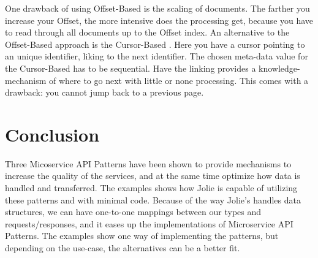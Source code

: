 \documentclass[12pt]{article}
\begin{document}
One drawback of using Offset-Based is the scaling of documents. The farther you increase your Offset, the more intensive does the processing get, because you have to read through all documents up to the Offset index. An alternative to the Offset-Based approach is the Cursor-Based \cite{CursorBased}. Here you have a cursor pointing to an unique identifier, liking to the next identifier. The chosen meta-data value for the Cursor-Based has to be sequential. Have the linking provides a knowledge-mechanism of where to go next with little or none processing. This comes with a drawback: you cannot jump back to a previous page. 

\section{Conclusion}

Three Micoservice API Patterns have been shown to provide mechanisms to increase the quality of the services, and at the same time optimize how data is handled and transferred. The examples shows how Jolie is capable of utilizing these patterns and with minimal code. Because of the way Jolie's handles data structures, we can have one-to-one mappings between our types and requests/responses, and it eases up the implementations of Microservice API Patterns. The examples show one way of implementing the patterns, but depending on the use-case, the alternatives can be a better fit. 

\newpage


\end{document}
